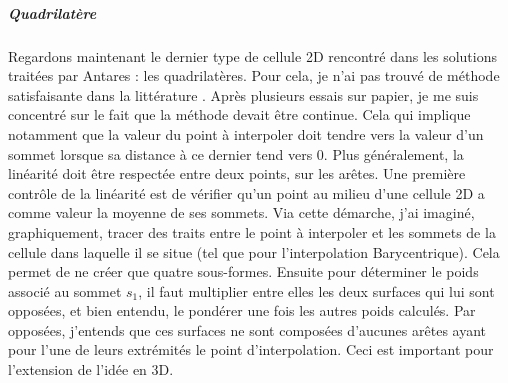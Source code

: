\newpage

\subparagraph{Quadrilatère}

Regardons maintenant le dernier type de cellule 2D rencontré dans les solutions traitées par Antares : les quadrilatères.
Pour cela, je n'ai pas trouvé de méthode satisfaisante dans la littérature \cite{perronnet1998}. Après plusieurs essais sur papier, je me suis concentré sur le fait que la méthode devait être continue.
Cela qui implique notamment que la valeur du point à interpoler doit tendre vers la valeur d'un sommet lorsque sa distance à ce dernier tend vers 0.
Plus généralement, la linéarité doit être respectée entre deux points, sur les arêtes.
Une première contrôle de la linéarité est de vérifier qu'un point au milieu d'une cellule 2D a comme valeur la moyenne de ses sommets.
Via cette démarche, j'ai imaginé, graphiquement, tracer des traits entre le point à interpoler et les sommets de la cellule dans laquelle il se situe (tel que pour l'interpolation Barycentrique).
Cela permet de ne créer que quatre sous-formes.
Ensuite pour déterminer le poids associé au sommet \( s_1 \), il faut multiplier entre elles les deux surfaces qui lui sont opposées, et bien entendu, le pondérer une fois les autres poids calculés.
Par opposées, j'entends que ces surfaces ne sont composées d'aucunes arêtes ayant pour l'une de leurs extrémités le point d'interpolation. Ceci est important pour l'extension de l'idée en 3D.

